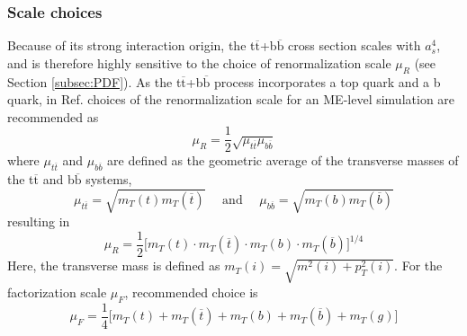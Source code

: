 \subsubsection{Scale choices}
\noindent Because of its strong interaction origin, the t$\overline{\text{t}}$+b$\overline{\text{b}}$ cross section scales with $a_s^4$, and is therefore highly sensitive to the choice of renormalization scale $\mu_R$ (see Section \ref{subsec:PDF}). As the t$\overline{\text{t}}$+b$\overline{\text{b}}$ process incorporates a top quark and a b quark, in Ref. \cite{Tom} choices of the renormalization scale for an ME-level simulation are recommended as
\begin{equation}
    \mu_R = \frac{1}{2}\sqrt{\mu_{t\overline{t}}\mu_{b\overline{b}}}
\end{equation}
where $\mu_{t\overline{t}}$ and $\mu_{b\overline{b}}$ are defined as the geometric average of the transverse masses of the t$\overline{\text{t}}$ and b$\overline{\text{b}}$ systems,
\begin{equation}
    \mu_{t\overline{t}} = \sqrt{m_T(t)m_T(\overline{t})} \:\:\:\:\:\: \text{and} \:\:\:\:\:\:  \mu_{b\overline{b}} = \sqrt{m_T(b)m_T(\overline{b})}
\end{equation}
resulting in 
\begin{equation}
    \mu_R = \frac{1}{2}\big[m_T(t) \cdot m_T(\overline{t}) \cdot m_T(b) \cdot m_T(\overline{b})\big]^{1/4}
\end{equation}
Here, the transverse mass is defined as $m_T(i) = \sqrt{m^2(i) +p_{T}^2(i)}$. For the factorization scale $\mu_F$, recommended choice is
\begin{equation}
    \mu_F = \frac{1}{4}\big[m_T(t) + m_T(\overline{t}) + m_T(b) + m_T(\overline{b}) + m_T(g)\big]
\end{equation}

